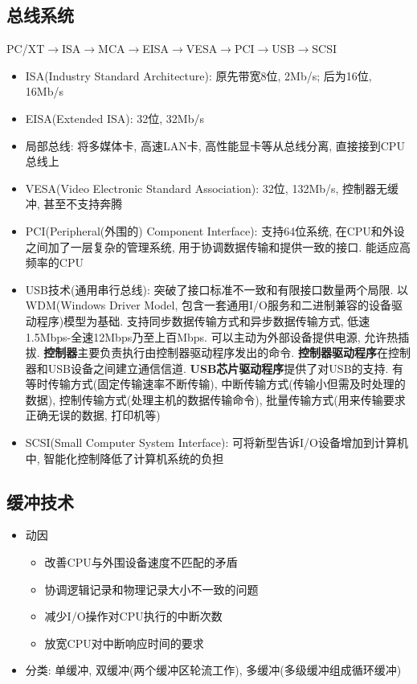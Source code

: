 \documentclass[a4paper, UTF8]{article}
\begin{document}
\subsection{总线系统}
PC/XT$\rightarrow$ISA$\rightarrow$MCA$\rightarrow$EISA$\rightarrow$VESA$\rightarrow$PCI$\rightarrow$USB$\rightarrow$SCSI
\begin{itemize}
\item ISA(Industry Standard Architecture): 原先带宽8位, 2Mb/s; 后为16位, 16Mb/s
\item EISA(Extended ISA): 32位, 32Mb/s
\item 局部总线: 将多媒体卡, 高速LAN卡, 高性能显卡等从总线分离, 直接接到CPU总线上
\item VESA(Video Electronic Standard Association): 32位, 132Mb/s, 控制器无缓冲, 甚至不支持奔腾
\item PCI(Peripheral(外围的) Component Interface): 支持64位系统, 在CPU和外设之间加了一层复杂的管理系统, 用于协调数据传输和提供一致的接口. 能适应高频率的CPU
\item USB技术(通用串行总线): 突破了接口标准不一致和有限接口数量两个局限. 以WDM(Windows Driver Model, 包含一套通用I/O服务和二进制兼容的设备驱动程序)模型为基础. 支持同步数据传输方式和异步数据传输方式, 低速1.5Mbps-全速12Mbps乃至上百Mbps. 可以主动为外部设备提供电源, 允许热插拔. \textbf{控制器}主要负责执行由控制器驱动程序发出的命令. \textbf{控制器驱动程序}在控制器和USB设备之间建立通信信道. \textbf{USB芯片驱动程序}提供了对USB的支持. 有等时传输方式(固定传输速率不断传输), 中断传输方式(传输小但需及时处理的数据), 控制传输方式(处理主机的数据传输命令), 批量传输方式(用来传输要求正确无误的数据, 打印机等)
\item SCSI(Small Computer System Interface): 可将新型告诉I/O设备增加到计算机中, 智能化控制降低了计算机系统的负担
\end{itemize}

\subsection{缓冲技术}
\begin{itemize}
\item 动因
	\begin{itemize}
	\item 改善CPU与外围设备速度不匹配的矛盾
	\item 协调逻辑记录和物理记录大小不一致的问题
	\item 减少I/O操作对CPU执行的中断次数
	\item 放宽CPU对中断响应时间的要求
	\end{itemize}
\item 分类: 单缓冲, 双缓冲(两个缓冲区轮流工作), 多缓冲(多级缓冲组成循环缓冲)
\end{itemize}
\end{document}
